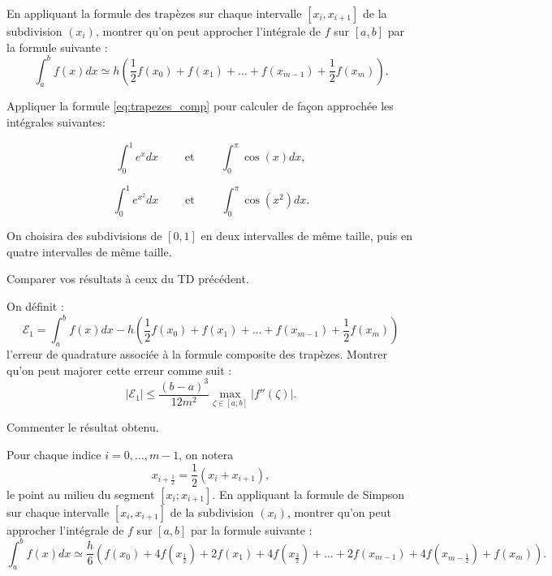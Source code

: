 \bigskip

\begin{exercice}

En appliquant la formule des trapèzes sur chaque intervalle $[x_i,x_{i+1}]$ de la subdivision $(x_i)$, montrer qu'on peut approcher l'intégrale de $f$ sur $[a,b]$ par la formule suivante :
\begin{equation}\label{eq:trapezes_comp}
\int_a^b f(x) dx \simeq
h \left (
\frac12 f(x_0) + f(x_1) + \ldots + f(x_{m-1}) + \frac12 f(x_m)
\right ).
\end{equation}

\end{exercice}

\medskip

\begin{exercice}

Appliquer la formule \eqref{eq:trapezes_comp} pour calculer de façon approchée les intégrales suivantes:

$$ \int_0^1 e^x dx \qquad \mbox{ et } \qquad \int_0^\pi \cos(x) dx,$$

$$ \int_0^1 e^{x^2} dx \qquad \mbox{ et } \qquad \int_0^\pi \cos(x^2) dx.$$

On choisira des subdivisions de $[0,1]$ en deux intervalles de même taille, puis en quatre intervalles de même taille.

\medskip

Comparer vos résultats à ceux du TD précédent.

\end{exercice}

\medskip

\begin{exercice}

On définit :
\[
\mathcal{E}_1 =
\int_a^b f(x) dx -
h \left (
\frac12 f(x_0) + f(x_1) + \ldots + f(x_{m-1}) + \frac12 f(x_m)
\right )
\]
l'erreur de quadrature associée à la formule composite des trapèzes. Montrer qu'on peut majorer cette erreur comme suit :
\[
| \mathcal{E}_1 | \leq \frac{(b-a)^3}{12 m^2} \max_{\zeta\in[a;b]} |f''(\zeta)|.
\]

Commenter le résultat obtenu.

\end{exercice}

\medskip

\begin{exercice}

Pour chaque indice $i=0,\ldots,m-1$, on notera 
\[
x_{i+\frac12} = \frac12 ( x_{i} + x_{i+1} ),
\]
le point au milieu du segment $[x_i;x_{i+1}]$.
En appliquant la formule de Simpson sur chaque intervalle $[x_i,x_{i+1}]$ de la subdivision $(x_i)$, montrer qu'on peut approcher l'intégrale de $f$ sur $[a,b]$ par la formule suivante :
\begin{equation}\label{eq:Simpson_comp}
\int_a^b f(x) dx \simeq
\frac{h}{6} \left (
f(x_0) + 4f(x_{\frac12}) + 2 f(x_1) + 4f(x_{\frac32}) +
\ldots + 2f(x_{m-1}) + 4 f(x_{m-\frac12}) + f(x_m)
\right ).
\end{equation}

\end{exercice}

